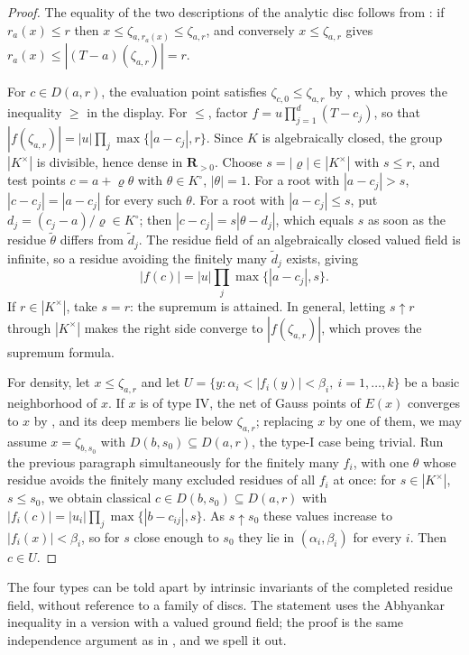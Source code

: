 \begin{proof}
The equality of the two descriptions of the analytic disc follows from
: if $r_a(x)\leq r$ then
$x\leq\zeta_{a,r_a(x)}\leq\zeta_{a,r}$, and conversely
$x\le\zeta_{a,r}$ gives
$r_a(x)\le|(T-a)(\zeta_{a,r})|=r$.

For $c\in D(a,r)$, the evaluation point satisfies
$\zeta_{c,0}\leq\zeta_{a,r}$ by ,
which proves the inequality $\geq$ in the display.  For $\leq$,
factor $f=u\prod_{j=1}^d(T-c_j)$, so that
$|f(\zeta_{a,r})|=|u|\prod_j\max\{|a-c_j|,r\}$.  Since $K$ is
algebraically closed, the group $|K^\times|$ is divisible, hence dense
in $\mathbf R_{>0}$.  Choose $s=|\varrho|\in|K^\times|$ with
$s\leq r$, and test points $c=a+\varrho\theta$ with
$\theta\in K^\circ$, $|\theta|=1$.  For a root with $|a-c_j|>s$,
$|c-c_j|=|a-c_j|$ for every such $\theta$.  For a root with
$|a-c_j|\leq s$, put $d_j=(c_j-a)/\varrho\in K^\circ$; then
$|c-c_j|=s|\theta-d_j|$, which equals $s$ as soon as the residue
$\tilde\theta$ differs from $\tilde d_j$.  The residue field of an
algebraically closed valued field is infinite, so a residue avoiding
the finitely many $\tilde d_j$ exists, giving
\[
 |f(c)|=|u|\prod_j\max\{|a-c_j|,s\}.
\]
If $r\in|K^\times|$, take $s=r$: the supremum is attained.  In
general, letting $s\uparrow r$ through $|K^\times|$ makes the right
side converge to $|f(\zeta_{a,r})|$, which proves the supremum
formula.

For density, let $x\leq\zeta_{a,r}$ and let
$U=\{y:\alpha_i<|f_i(y)|<\beta_i,\ i=1,\ldots,k\}$ be a basic
neighborhood of $x$.  If $x$ is of type IV, the net of Gauss points
of $E(x)$ converges to $x$ by
, and its deep members lie below
$\zeta_{a,r}$; replacing $x$ by one of them, we may assume
$x=\zeta_{b,s_0}$ with $D(b,s_0)\subseteq D(a,r)$, the type-I case
being trivial.  Run the previous paragraph simultaneously for the
finitely many $f_i$, with one $\theta$ whose residue avoids the
finitely many excluded residues of all $f_i$ at once: for
$s\in|K^\times|$, $s\le s_0$, we obtain classical
$c\in D(b,s_0)\subseteq D(a,r)$ with
$|f_i(c)|=|u_i|\prod_j\max\{|b-c_{ij}|,s\}$.  As $s\uparrow s_0$
these values increase to $|f_i(x)|<\beta_i$, so for $s$ close
enough to $s_0$ they lie in $(\alpha_i,\beta_i)$ for every $i$.
Then $c\in U$.
\end{proof}

The four types can be told apart by intrinsic invariants of the
completed residue field, without reference to a family of discs.  The
statement uses the Abhyankar inequality in a version with a valued
ground field; the proof is the same independence argument as in
, and we spell it out.

